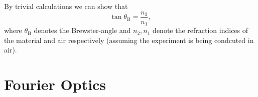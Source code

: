 By trivial calculations we can show that
\begin{equation}\label{eq:brewster}
	\tan\theta_\text{B}=\frac{n_2}{n_1},
\end{equation}
where $\theta_\text{B}$ denotes the Brewster-angle and $n_2, n_1$ denote the refraction indices of the material and air respectively (assuming the experiment is being condcuted in air).
\section{Fourier Optics}
